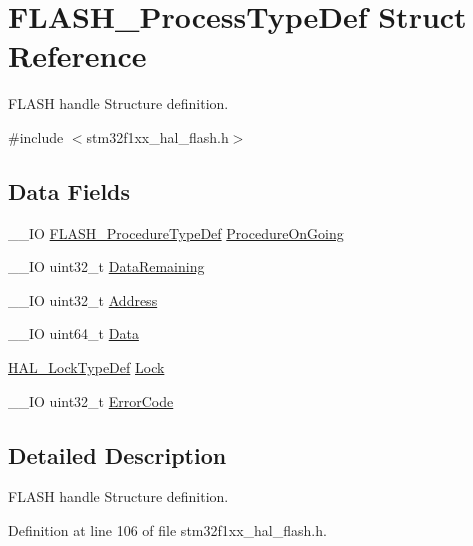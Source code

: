 \hypertarget{struct_f_l_a_s_h___process_type_def}{}\section{F\+L\+A\+S\+H\+\_\+\+Process\+Type\+Def Struct Reference}
\label{struct_f_l_a_s_h___process_type_def}


F\+L\+A\+SH handle Structure definition.  




{\ttfamily \#include $<$stm32f1xx\+\_\+hal\+\_\+flash.\+h$>$}

\subsection*{Data Fields}
\begin{DoxyCompactItemize}
\item 
\+\_\+\+\_\+\+IO \hyperlink{group___f_l_a_s_h___exported___types_ga2b0268387bc11bcab76be9ce7c43eaaf}{F\+L\+A\+S\+H\+\_\+\+Procedure\+Type\+Def} \hyperlink{struct_f_l_a_s_h___process_type_def_a5e0516d2d3654cef74de4ed427c16d26}{Procedure\+On\+Going}
\item 
\+\_\+\+\_\+\+IO uint32\+\_\+t \hyperlink{struct_f_l_a_s_h___process_type_def_a04975ac6f628743bfcd68da33d96cdee}{Data\+Remaining}
\item 
\+\_\+\+\_\+\+IO uint32\+\_\+t \hyperlink{struct_f_l_a_s_h___process_type_def_a1cfe8c27be9a16679f15eda30081bd30}{Address}
\item 
\+\_\+\+\_\+\+IO uint64\+\_\+t \hyperlink{struct_f_l_a_s_h___process_type_def_a59e6cefcc14b8810b8f48ae2785ed3fe}{Data}
\item 
\hyperlink{stm32f1xx__hal__def_8h_ab367482e943333a1299294eadaad284b}{H\+A\+L\+\_\+\+Lock\+Type\+Def} \hyperlink{struct_f_l_a_s_h___process_type_def_ad4cf225029dbefe8d3fe660c33b8bb6b}{Lock}
\item 
\+\_\+\+\_\+\+IO uint32\+\_\+t \hyperlink{struct_f_l_a_s_h___process_type_def_a123c5063e6a3b1901b2fbe5f88c53a7e}{Error\+Code}
\end{DoxyCompactItemize}


\subsection{Detailed Description}
F\+L\+A\+SH handle Structure definition. 

Definition at line 106 of file stm32f1xx\+\_\+hal\+\_\+flash.\+h.



